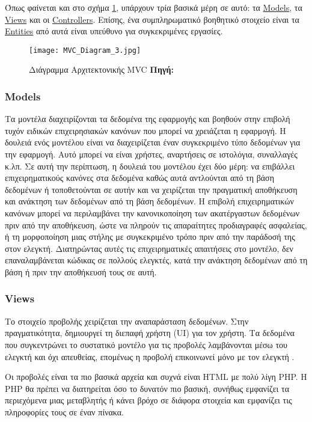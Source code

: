 Όπως φαίνεται και στο σχήμα \ref{fig:mvc-arch}, υπάρχουν τρία βασικά μέρη σε αυτό: τα \hyperref[thb:Models]{Models}, τα \hyperref[thb:Views]{Views} και οι \hyperref[thb:Controllers]{Controllers}. Επίσης, ένα συμπληρωματικό βοηθητικό στοιχείο είναι τα \hyperref[thb:Entities]{Entities} από αυτά είναι υπεύθυνο για συγκεκριμένες εργασίες.

\begin{figure}[h]
	\centering
	\texttt{[image: MVC\_Diagram\_3.jpg]}
	\caption[{Διάγραμμα Αρχιτεκτονικής MVC}]{Διάγραμμα Αρχιτεκτονικής MVC \textbf{Πηγή:} \cite{fig_MVC_Diagram_3}}
	\label{fig:mvc-arch}
\end{figure}

\subsubsection{Models} \label{thb:Models}
Τα μοντέλα διαχειρίζονται τα δεδομένα της εφαρμογής και βοηθούν στην επιβολή τυχόν ειδικών επιχειρησιακών κανόνων που μπορεί να χρειάζεται η εφαρμογή. Η δουλειά ενός μοντέλου είναι να διαχειρίζεται έναν συγκεκριμένο τύπο δεδομένων για την εφαρμογή. Αυτό μπορεί να είναι χρήστες, αναρτήσεις σε ιστολόγια, συναλλαγές κ.λπ. Σε αυτή την περίπτωση, η δουλειά του μοντέλου έχει δύο μέρη: να επιβάλλει επιχειρηματικούς κανόνες στα δεδομένα καθώς αυτά αντλούνται από τη βάση δεδομένων ή τοποθετούνται σε αυτήν και να χειρίζεται την πραγματική αποθήκευση και ανάκτηση των δεδομένων από τη βάση δεδομένων. Η επιβολή επιχειρηματικών κανόνων μπορεί να περιλαμβάνει την κανονικοποίηση των ακατέργαστων δεδομένων πριν από την αποθήκευση, ώστε να πληρούν τις απαραίτητες προδιαγραφές ασφαλείας, ή τη μορφοποίηση μιας στήλης με συγκεκριμένο τρόπο πριν από την παράδοσή της στον ελεγκτή. Διατηρώντας αυτές τις επιχειρηματικές απαιτήσεις στο μοντέλο, δεν επαναλαμβάνεται κώδικας σε πολλούς ελεγκτές, κατά την ανάκτηση δεδομένων από τη βάση ή πριν την αποθήκευσή τους σε αυτή.

\subsubsection{Views} \label{thb:Views}
Το στοιχείο προβολής χειρίζεται την αναπαράσταση δεδομένων. Στην πραγματικότητα, δημιουργεί τη διεπαφή χρήστη (UI) για τον χρήστη. Τα δεδομένα που συγκεντρώνει το συστατικό μοντέλο για τις προβολές λαμβάνονται μέσω του ελεγκτή και όχι απευθείας, επομένως η προβολή επικοινωνεί μόνο με τον ελεγκτή \cite{tutorials_2022}.

Οι προβολές είναι τα πιο βασικά αρχεία και συχνά είναι HTML με πολύ λίγη PHP. Η PHP θα πρέπει να διατηρείται όσο το δυνατόν πιο βασική, συνήθως εμφανίζει τα περιεχόμενα μιας μεταβλητής ή κάνει βρόχο σε διάφορα στοιχεία και εμφανίζει τις πληροφορίες τους σε έναν πίνακα.


